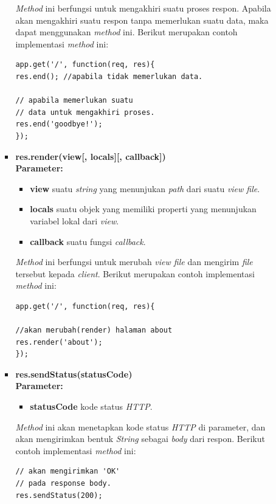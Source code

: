 \documentclass[a4paper,twoside]{article}
\begin{document}
\begin{enumerate}
\begin{enumerate}
\begin{itemize}
				\textit{Method} ini berfungsi untuk mengakhiri suatu proses respon. Apabila akan mengakhiri suatu respon tanpa memerlukan suatu data, maka dapat menggunakan \textit{method} ini. Berikut merupakan contoh implementasi \textit{method} ini:
\begin{lstlisting}
app.get('/', function(req, res){
res.end(); //apabila tidak memerlukan data.

// apabila memerlukan suatu 
// data untuk mengakhiri proses.
res.end('goodbye!'); 
});
\end{lstlisting}
				
				\item \textbf{res.render(view[, locals][, callback])} \\ \textbf{Parameter:}
				\begin{itemize}
					\item \textbf{view} suatu \textit{string} yang menunjukan \textit{path} dari suatu \textit{view file}.
					\item \textbf{locals} suatu objek yang memiliki properti yang menunjukan variabel lokal dari \textit{view}.
					\item \textbf{callback} suatu fungsi \textit{callback}. 
				\end{itemize}
				
				\textit{Method} ini berfungsi untuk merubah \textit{view file} dan mengirim \textit{file} tersebut kepada \textit{client}. Berikut merupakan contoh implementasi \textit{method} ini:
\begin{lstlisting}
app.get('/', function(req, res){

//akan merubah(render) halaman about 
res.render('about');  
});
\end{lstlisting}
				
				\item \textbf{res.sendStatus(statusCode)} \\ \textbf{Parameter:} 
				\begin{itemize}
					\item \textbf{statusCode} kode status \textit{HTTP}.
				\end{itemize}
				
				\textit{Method} ini akan menetapkan kode status \textit{HTTP} di parameter, dan akan mengirimkan bentuk \textit{String} sebagai \textit{body} dari respon. Berikut contoh implementasi \textit{method} ini:
\begin{lstlisting}
// akan mengirimkan 'OK' 
// pada response body.
res.sendStatus(200); 
				

\end{lstlisting}
\end{itemize}
\end{enumerate}
\end{enumerate}
\end{document}
